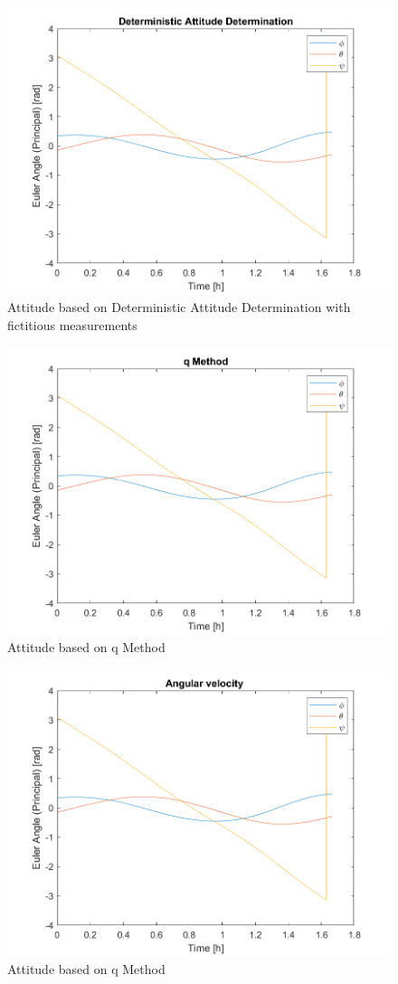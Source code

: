 \begin{figure}[H]
\centering
\includegraphics[scale=0.7]{Images/ps6_problem6_DAD.png}
\caption{Attitude based on Deterministic Attitude Determination with fictitious measurements}
\label{fig:Images/ps6_problem6_DAD}
\end{figure}

\begin{figure}[H]
\centering
\includegraphics[scale=0.7]{Images/ps6_problem6_qMethod.png}
\caption{Attitude based on q Method}
\label{fig:Images/ps6_problem6_qMethod}
\end{figure}

\begin{figure}[H]
\centering
\includegraphics[scale=0.7]{Images/ps6_problem6_kins.png}
\caption{Attitude based on q Method}
\label{fig:Images/ps6_problem6_kins}
\end{figure}